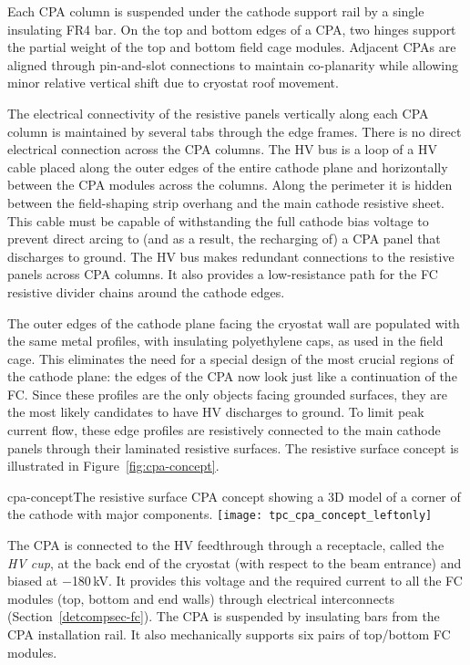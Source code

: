 Each CPA column is suspended under the cathode support rail by a single insulating FR4 bar.  On the top and bottom edges of a CPA, two hinges support the partial weight of the top and bottom field cage modules.   Adjacent CPAs are aligned through pin-and-slot connections to maintain co-planarity while allowing minor relative vertical shift due to cryostat roof movement.

The electrical connectivity of the resistive panels vertically along each CPA column is maintained by several tabs through the edge frames.  There is no direct electrical connection across the CPA columns. 
The HV bus is a loop of a HV cable placed along the outer edges of the entire cathode plane and horizontally between the CPA modules across the columns. Along the perimeter it is hidden between the field-shaping strip overhang and the main cathode resistive sheet.  This cable must be capable of withstanding the full cathode bias voltage to prevent direct arcing to (and as a result, the recharging of) a CPA panel that discharges to ground. 
The HV bus makes redundant connections to the resistive panels across CPA columns.  It also provides a low-resistance path for the FC resistive divider chains around the cathode edges.

The outer edges of the cathode plane facing the cryostat wall are populated with the same metal profiles, with insulating polyethylene caps, as used in the field cage.  This eliminates the need for a special design of the most crucial regions of the cathode plane: the edges of the CPA now look just like a continuation of the FC.  Since these profiles are the only objects facing grounded surfaces, they are the most likely candidates to have HV discharges to ground.   To limit peak current flow, these edge profiles are resistively connected to the main cathode panels through their laminated resistive surfaces.  The resistive surface concept is illustrated in Figure~\ref{fig:cpa-concept}.

\begin{cdrfigure}{cpa-concept}{The resistive surface CPA concept showing  
 a 3D model of a corner of the cathode with major components.} 
\texttt{[image: tpc\_cpa\_concept\_leftonly]}
\end{cdrfigure}

The CPA is connected to the HV feedthrough through a receptacle, called the \textit{HV cup}, at the back end of the cryostat (with respect to the beam entrance) and biased at $-$180\,kV.   It provides this voltage and the required current to all the FC modules (top, bottom and end walls) through electrical interconnects (Section~\ref{detcompsec-fc}). The CPA is suspended by insulating bars from the CPA installation rail.  It also mechanically supports six pairs of top/bottom FC modules.


